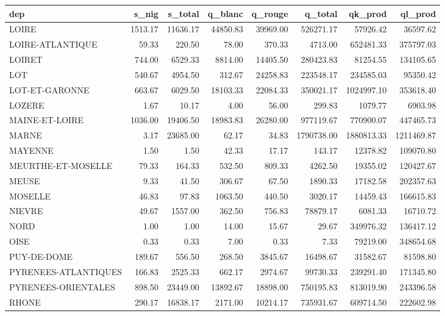 \documentclass[11pt, a4paper]{article}
\begin{document}
\hskip-2.0cm\begin{tabular}{lrrrrrrr}
  \hline
   dep & s\_nig & s\_total & q\_blanc & q\_rouge & q\_total & qk\_prod & ql\_prod 
\\ 
  \hline
  LOIRE & 1513.17 & 11636.17 & 44850.83 & 39969.00 & 526271.17 & 57926.42 & 36597.62 \\ 
  LOIRE-ATLANTIQUE & 59.33 & 220.50 & 78.00 & 370.33 & 4713.00 & 652481.33 & 375797.03 \\ 
  LOIRET & 744.00 & 6529.33 & 8814.00 & 14405.50 & 280423.83 & 81254.55 & 134105.65 \\ 
  LOT & 540.67 & 4954.50 & 312.67 & 24258.83 & 223548.17 & 234585.03 & 95350.42 \\
  LOT-ET-GARONNE & 663.67 & 6029.50 & 18103.33 & 22084.33 & 350021.17 & 1024997.10 & 353618.40 \\ 
  LOZERE & 1.67 & 10.17 & 4.00 & 56.00 & 299.83 & 1079.77 & 6903.98 \\ 
  MAINE-ET-LOIRE & 1036.00 & 19406.50 & 18983.83 & 26280.00 & 977119.67 & 770900.07 & 447465.73 \\ 
  MARNE & 3.17 & 23685.00 & 62.17 & 34.83 & 1790738.00 & 1880813.33 & 1211469.87 \\
  MAYENNE & 1.50 & 1.50 & 42.33 & 17.17 & 143.17 & 12378.82 & 109070.80 \\ 
  MEURTHE-ET-MOSELLE & 79.33 & 164.33 & 532.50 & 809.33 & 4262.50 & 19355.02 & 120427.67 \\ 
  MEUSE & 9.33 & 41.50 & 306.67 & 67.50 & 1890.33 & 17182.58 & 202357.63 \\ 
  MOSELLE & 46.83 & 97.83 & 1063.50 & 440.50 & 3020.17 & 14459.43 & 166615.83 \\ 
  NIEVRE & 49.67 & 1557.00 & 362.50 & 756.83 & 78879.17 & 6081.33 & 16710.72 \\ 
  NORD & 1.00 & 1.00 & 14.00 & 15.67 & 29.67 & 349976.32 & 136417.12 \\ 
  OISE & 0.33 & 0.33 & 7.00 & 0.33 & 7.33 & 79219.00 & 348654.68 \\ 
  PUY-DE-DOME & 189.67 & 556.50 & 268.50 & 3845.67 & 16498.67 & 31582.67 & 81598.80 \\ 
  PYRENEES-ATLANTIQUES & 166.83 & 2525.33 & 662.17 & 2974.67 & 99730.33 & 239291.40 & 171345.80 \\ 
  PYRENEES-ORIENTALES & 898.50 & 23449.00 & 13892.67 & 18898.00 & 750195.83 & 813019.90 & 243396.58 \\ 
  RHONE & 290.17 & 16838.17 & 2171.00 & 10214.17 & 735931.67 & 609714.50 & 222602.98 \\ 

\end{tabular}
\end{document}
